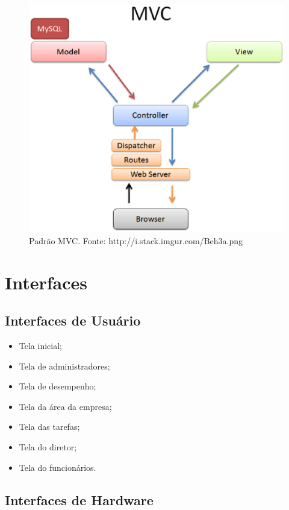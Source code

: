 \begin{apendicesenv}
\begin{figure}[htb]
	\centering
	\label{figura_mvc}
		\includegraphics[keepaspectratio=true,scale=0.6]{figuras/MVC.eps}
	\caption{Padrão MVC. Fonte: http://i.stack.imgur.com/Beh3a.png}
\end{figure}

\clearpage{}

\section{Interfaces}

\subsection{Interfaces de Usuário}

\begin{itemize}
  \item{Tela inicial;}
  \item{Tela de administradores;}
  \item{Tela de desempenho;}
  \item{Tela da área da empresa;}
  \item{Tela das tarefas;}
  \item{Tela do diretor;}
  \item{Tela do funcionários.}
\end{itemize}


\subsection{Interfaces de Hardware}


\end{apendicesenv}
